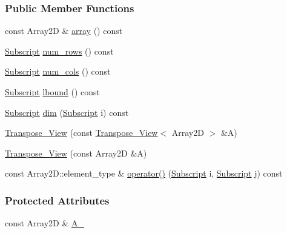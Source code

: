 \subsubsection*{Public Member Functions}
\begin{DoxyCompactItemize}
\item 
const Array2D \& \hyperlink{class_t_n_t_1_1_transpose___view_ae5852ca8158de22454419aeb1e6a71e0}{array} () const 
\item 
\hyperlink{namespace_t_n_t_af22e3f1460e145c04ce4e7d701e4c1c1}{Subscript} \hyperlink{class_t_n_t_1_1_transpose___view_a23f828f358d885f077cdf01a7a42dab8}{num\_\-rows} () const 
\item 
\hyperlink{namespace_t_n_t_af22e3f1460e145c04ce4e7d701e4c1c1}{Subscript} \hyperlink{class_t_n_t_1_1_transpose___view_a0dc9d85365feadce0281683ee505047d}{num\_\-cols} () const 
\item 
\hyperlink{namespace_t_n_t_af22e3f1460e145c04ce4e7d701e4c1c1}{Subscript} \hyperlink{class_t_n_t_1_1_transpose___view_af4d7a1436184686c38c62604169bb2a0}{lbound} () const 
\item 
\hyperlink{namespace_t_n_t_af22e3f1460e145c04ce4e7d701e4c1c1}{Subscript} \hyperlink{class_t_n_t_1_1_transpose___view_a5063562533e51a1104c1b527dc31d0b1}{dim} (\hyperlink{namespace_t_n_t_af22e3f1460e145c04ce4e7d701e4c1c1}{Subscript} i) const 
\item 
\hyperlink{class_t_n_t_1_1_transpose___view_a85d95b78cca56ecde8a8ca81ad947be7}{Transpose\_\-View} (const \hyperlink{class_t_n_t_1_1_transpose___view}{Transpose\_\-View}$<$ Array2D $>$ \&A)
\item 
\hyperlink{class_t_n_t_1_1_transpose___view_ae763aec68c97baf150c762126cd2fe56}{Transpose\_\-View} (const Array2D \&A)
\item 
const Array2D::element\_\-type \& \hyperlink{class_t_n_t_1_1_transpose___view_a9037dfe33672186c1f76b42e273d5b0e}{operator()} (\hyperlink{namespace_t_n_t_af22e3f1460e145c04ce4e7d701e4c1c1}{Subscript} i, \hyperlink{namespace_t_n_t_af22e3f1460e145c04ce4e7d701e4c1c1}{Subscript} j) const 
\end{DoxyCompactItemize}
\subsubsection*{Protected Attributes}
\begin{DoxyCompactItemize}
\item 
const Array2D \& \hyperlink{class_t_n_t_1_1_transpose___view_a5d8697c7b34914edd256dc8af2c1723d}{A\_\-}
\end{DoxyCompactItemize}



